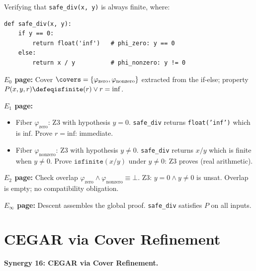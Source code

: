 \begin{example}
\label{ex:spectral-execution}
Verifying that \texttt{safe\_div(x, y)} is always finite, where:
\begin{lstlisting}
def safe_div(x, y):
    if y == 0:
        return float('inf')   # phi_zero: y == 0
    else:
        return x / y          # phi_nonzero: y != 0
\end{lstlisting}

\textbf{$E_0$ page:} Cover $\covers = \{\varphi_{\mathrm{zero}},
\varphi_{\mathrm{nonzero}}\}$ extracted from the if-else; property
$P(x, y, r) \defeq \mathtt{isfinite}(r) \vee r = \mathrm{inf}$.

\textbf{$E_1$ page:}
\begin{itemize}
\item Fiber $\varphi_{\mathrm{zero}}$: Z3 with hypothesis $y=0$.
  \texttt{safe\_div} returns \texttt{float('inf')} which is $\mathrm{inf}$.
  Prove $r = \mathrm{inf}$: immediate. \checkmark
\item Fiber $\varphi_{\mathrm{nonzero}}$: Z3 with hypothesis $y \ne 0$.
  \texttt{safe\_div} returns $x / y$ which is finite when $y \ne 0$.
  Prove $\mathtt{isfinite}(x/y)$ under $y \ne 0$: Z3 proves (real arithmetic). \checkmark
\end{itemize}

\textbf{$E_2$ page:} Check overlap $\varphi_{\mathrm{zero}} \wedge
\varphi_{\mathrm{nonzero}} \equiv \bot$.  Z3: $y = 0 \wedge y \ne 0$ is
unsat. \checkmark  Overlap is empty; no compatibility obligation.

\textbf{$E_\infty$ page:} Descent assembles the global proof.
\texttt{safe\_div} satisfies $P$ on all inputs.
\end{example}


\section{CEGAR via Cover Refinement}
\label{sec:cegar}

\noindent\textbf{Synergy 16: CEGAR via Cover Refinement.}

